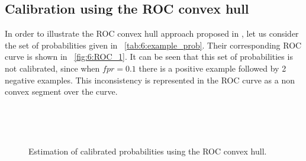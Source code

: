 \subsection{Calibration using the ROC convex hull}

In order to illustrate the ROC convex hull approach proposed in \citep{Hernandez-Orallo2012},
let us consider the set of probabilities given in \figurename{~\ref{tab:6:example_prob}}.
Their corresponding  ROC curve  is shown in \figurename{~\ref{fig:6:ROC_1}}.  It can be seen that 
this set of probabilities is not calibrated, since when $fpr=0.1$ there is a positive example  
followed by 2 negative examples. This inconsistency is represented in the ROC curve as a non convex 
segment  over the curve.
  
\begin{figure}[!t]
\hskip 0.5cm
\hbox{
  \hskip 0.5cm
}
\vskip 1.5cm

\hbox{ 
  \hskip 1cm
}
\caption{Estimation of calibrated probabilities using the ROC convex hull.}\label{fig:6:rocch}
\end{figure}

